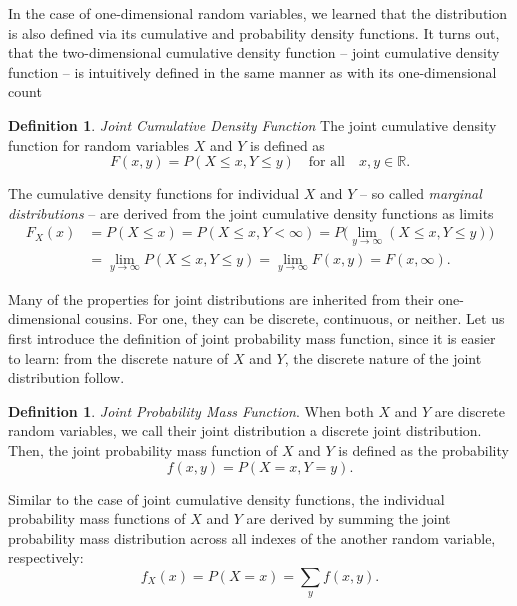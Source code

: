 \documentclass[12pt,a4paper,leqno]{report}
\newcommand{\R}{\mathbb{R}}
\theoremstyle{plain}
\theoremstyle{definition}
\newtheorem{maar}[equation]{Definition}
\begin{document}
In the case of one-dimensional random variables, we learned that the distribution is also defined via its cumulative and probability density functions. It turns out, that the two-dimensional cumulative density function -- joint cumulative density function -- is intuitively defined in the same manner as with its one-dimensional count

\begin{maar}
\emph{Joint Cumulative Density Function} The joint cumulative density function for random variables $X$ and $Y$ is defined as
\[
F(x,y) = P( X \leq x, Y \leq y) \quad \text{for all} \quad x,y \in \R.
\]
\end{maar}

The cumulative density functions for individual $X$ and $Y$ -- so called \emph{marginal distributions} -- are derived from the joint cumulative density functions as limits
\[
\begin{split}
F_X(x) &= P(X \leq x) = P(X \leq x, Y < \infty) = P \big( \lim_{y \rightarrow \infty}( X \leq x, Y \leq y) \big) \\ 
&= \lim_{y \rightarrow \infty} P (X \leq x, Y \leq y ) = \lim_{y \rightarrow \infty} F(x,y) = F(x,\infty).
\end{split}
\]

\bigskip

Many of the properties for joint distributions are inherited from their one-dimensional cousins. For one, they can be discrete, continuous, or neither. Let us first introduce the definition of joint probability mass function, since it is easier to learn: from the discrete nature of $X$ and $Y$, the discrete nature of the joint distribution follow.

\begin{maar}
\emph{Joint Probability Mass Function}. When both $X$ and $Y$ are discrete random variables, we call their joint distribution a discrete joint distribution. Then, the joint probability mass function of $X$ and $Y$ is defined as the probability 
\[
f(x,y) = P(X = x, Y = y).
\] 
\end{maar}

Similar to the case of joint cumulative density functions, the individual probability mass functions of $X$ and $Y$ are derived by summing the joint probability mass distribution across all indexes of the another random variable, respectively:
\[
f_X(x) = P(X = x) = \sum_{y}f(x,y) .
\]
\end{document}
